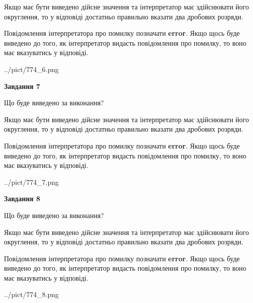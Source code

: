 \documentclass[12pt, ukrainian]{article}
\begin{document}
{\begin {Large}
Якщо має бути виведено дійсне значення та інтерпретатор має здійснювати його округлення, 
то у відповіді достатньо правильно вказати два дробових розряди.

Повідомлення інтерпретатора про помилку позначати \textbf{error}.
Якщо щось буде виведено до того, як інтерпретатор видасть повідомлення про помилку, 
то воно має вказуватись у відповіді. \par

\begin{center}
	{../pict/774_6.png}
\end{center}
\newpage

{\begin {center}\textbf{Завдання 7}\end {center}}\par
Що буде виведено за виконання? \par

Якщо має бути виведено дійсне значення та інтерпретатор має здійснювати його округлення, 
то у відповіді достатньо правильно вказати два дробових розряди.

Повідомлення інтерпретатора про помилку позначати \textbf{error}.
Якщо щось буде виведено до того, як інтерпретатор видасть повідомлення про помилку, 
то воно має вказуватись у відповіді. \par

\begin{center}
	{../pict/774_7.png}
\end{center}
\newpage

{\begin {center}\textbf{Завдання 8}\end {center}}\par
Що буде виведено за виконання? \par

Якщо має бути виведено дійсне значення та інтерпретатор має здійснювати його округлення, 
то у відповіді достатньо правильно вказати два дробових розряди.

Повідомлення інтерпретатора про помилку позначати \textbf{error}.
Якщо щось буде виведено до того, як інтерпретатор видасть повідомлення про помилку, 
то воно має вказуватись у відповіді. \par

\begin{center}
	{../pict/774_8.png}
\end{center}
\newpage


\end{Large}}
\end{document}
